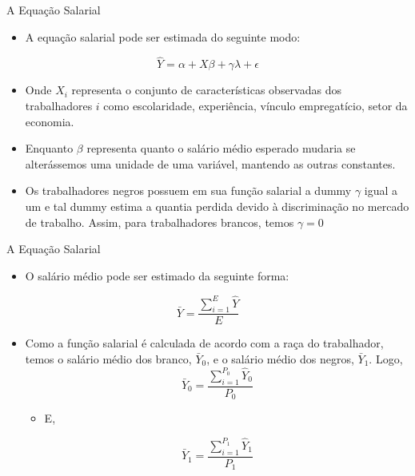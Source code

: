 \documentclass[10pt, xcolor=x11names,compress]{beamer}
\begin{document}
	\begin{frame}{A Equação Salarial}
		\begin{itemize}
			\item A equação salarial pode ser estimada do seguinte modo:
		\end{itemize}
			\begin{equation}
			\hat{Y} = \alpha + X\beta +  \gamma \lambda + \epsilon
		\end{equation}	
		\begin{itemize}
			\item Onde $X_{i}$ representa o conjunto de características observadas dos trabalhadores $i$ como escolaridade, experiência, vínculo empregatício, setor da economia.
			\item Enquanto $\beta$ representa quanto o salário médio esperado mudaria se alterássemos uma unidade de uma variável, mantendo as outras constantes.
			\item Os trabalhadores negros possuem em sua função salarial a dummy $\gamma$ igual a um e tal dummy estima a quantia perdida devido à discriminação no mercado de trabalho. Assim, para trabalhadores brancos, temos $\gamma = 0$
		\end{itemize}
		\end{frame}
		
			\begin{frame}{A Equação Salarial}
			\begin{itemize}
				\item O salário médio pode ser estimado da seguinte forma:
			\end{itemize}
			\begin{equation}
				\bar{Y} =  \frac{\sum_{i=1}^{E} \hat{Y}}{E}
			\end{equation}	
			\begin{itemize}
				\item Como a função salarial é calculada de acordo com a raça do trabalhador, temos o salário médio dos branco, $\bar{Y}_{0}$, e o salário médio dos negros, $\bar{Y}_{1}$. Logo,
			\begin{equation}
			\bar{Y}_{0} =  \frac{\sum_{i=1}^{P_{0}} \hat{Y}_{0}}{P_{0}}
			\end{equation}	
			\begin{itemize}
				\item E,	
			\end{itemize}
			\begin{equation}
			\bar{Y}_{1} =  \frac{\sum_{i=1}^{P_{1}} \hat{Y}_{1}}{P_{1}}
			\end{equation}	
			\end{itemize}
			\end{frame}		
			
\end{document}
